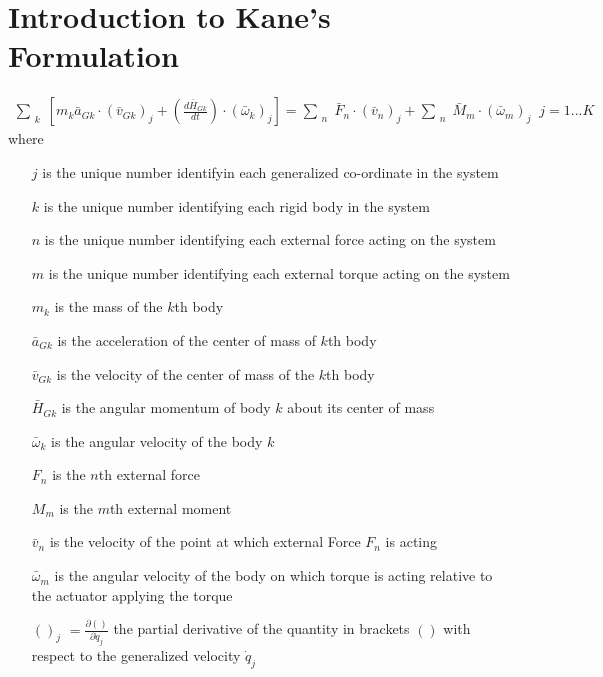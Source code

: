 \documentclass[a4paper,10pt]{article}
\begin{document}
\section{Introduction to Kane's Formulation}
\begin{align}
 \sum_{\substack{k}} \left[ m_k \bar{a}_{Gk} \cdot \left(\bar{v}_{Gk}\right)_j + \left( \frac{d\bar{H}_{Gk}}{dt} 
 \right) \cdot \left( \bar\omega_k \right)_j \right] = \sum_{\substack{n}}  \bar{F}_n \cdot \left( \bar{v}_n \right)_j 
 + \sum_{\substack{n}}  \bar{M}_m \cdot \left( \bar{\omega}_m \right)_j \;\; j=1 ... K
\end{align}
where 
\begin{itemize}[label={}]
\item[$j$] is the unique number identifyin each generalized co-ordinate in the system
\item[$k$] is the unique number identifying each rigid body in the system
\item[$n$] is the unique number identifying each external force acting on the system
\item[$m$] is the unique number identifying each external torque acting on the system
\item[$m_k$] is the mass of the $k$th body
\item[$\bar{a}_{Gk}$] is the acceleration of the center of mass of $k$th body
\item[$\bar{v}_{Gk}$] is the velocity of the center of mass of the $k$th body
\item[$\bar{H}_{Gk}$] is the angular momentum of body $k$ about its center of mass
\item[$\bar{\omega}_{k}$] is the angular velocity of the body $k$
\item[$F_n$] is the $n$th external force
\item[$M_m$] is the $m$th external moment
\item[$\bar{v}_{n}$] is the velocity of the point at which external Force $F_n$ is acting
\item[$\bar{\omega}_{m}$] is the angular velocity of the body on which torque is acting relative to the actuator applying the torque
\item[$()_j$] $=\frac{\partial ()}{\partial \dot{q}_j}$ the partial derivative of the quantity in brackets $()$ with respect to the generalized
velocity $\dot{q}_j$
\end{itemize}
\end{document}
